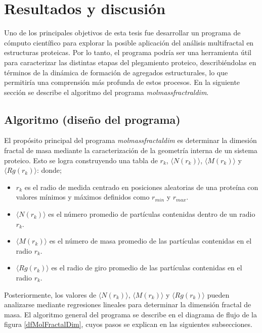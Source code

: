 \chapter{Resultados y discusi\'{o}n}

Uno de los principales objetivos de esta tesis fue desarrollar un programa de c\'{o}mputo cient\'{i}fico para explorar la posible aplicaci\'{o}n del an\'{a}lisis multifractal en estructuras proteicas. Por lo tanto, el programa podr\'{i}a ser una herramienta \'{u}til para caracterizar las distintas etapas del plegamiento proteico, describi\'{e}ndolas en t\'{e}rminos de la din\'{a}mica de formaci\'{o}n de agregados estructurales, lo que permitir\'{i}a una comprensi\'{o}n m\'{a}s profunda de estos procesos. En la siguiente secci\'{o}n se describe el algoritmo del programa \textit{molmassfractraldim}. 
 
 
\section{Algoritmo (diseño del programa)}

El prop\'{o}sito principal del programa \textit{molmassfractaldim} es determinar la dimesi\'{o}n fractal de masa mediante la caracterizaci\'{o}n de la geometr\'{i}a interna de un sistema proteico. Esto se logra construyendo una tabla de $r_{k}$, $\langle N(r_k) \rangle$, $\langle M(r_k) \rangle$ y $\langle Rg(r_k) \rangle$: donde;

\begin{itemize}
	\item $r_{k}$ es el radio de medida centrado en posiciones aleatorias de una prote\'{i}na con valores m\'{i}nimos y m\'{a}ximos definidos como $r_{min}$ y $r_{max}$.
	\item $\langle N(r_k) \rangle$ es el n\'{u}mero promedio de part\'{i}culas contenidas dentro de un radio $r_{k}$. 
	\item  $\langle M(r_k) \rangle$ es el n\'{u}mero de masa promedio de las part\'{i}culas contenidas en el radio $r_{k}$.
	\item  $\langle Rg(r_k) \rangle$ es el radio de giro promedio de las part\'{i}culas contenidas en el radio $r_{k}$.
\end{itemize}

Posteriormente, los valores de $\langle N(r_k) \rangle$, $\langle M(r_k) \rangle$ y $\langle Rg(r_k) \rangle$ pueden analizarse mediante regresiones lineales para determinar la dimensi\'{o}n fractal de masa. El algoritmo general del programa se describe en el diagrama de flujo de la figura \ref{dfMolFractalDim}, cuyos pasos se explican en las siguientes subsecciones.
 
